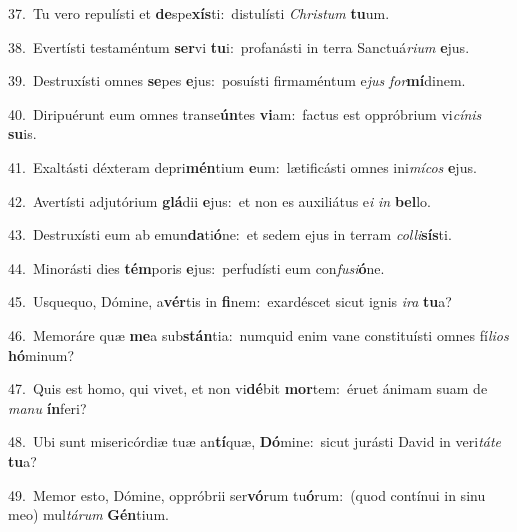 {\numbfont\textcolor{\numbcolor}{37.}}~Tu vero repulísti et \textbf{de}\-spe\-\textbf{xís}\-ti:~\star distulísti \textit{Chris}\-\textit{tum} \textbf{tu}\-um.\par
{\numbfont\textcolor{\numbcolor}{38.}}~Evertísti testaméntum \textbf{ser}\-vi \textbf{tu}\-i:~\star profanásti in terra Sanctuá\-\textit{ri}\-\textit{um} \textbf{e}\-jus.\par
{\numbfont\textcolor{\numbcolor}{39.}}~Destruxísti omnes \textbf{se}\-pes \textbf{e}\-jus:~\star posuísti firmaméntum e\textit{jus} \textit{for}\-\textbf{mí}dinem.\par
{\numbfont\textcolor{\numbcolor}{40.}}~Diripuérunt eum omnes transe\-\textbf{ún}\-tes \textbf{vi}\-am:~\star factus est oppróbrium vi\-\textit{cí}\-\textit{nis} \textbf{su}\-is.\par
{\numbfont\textcolor{\numbcolor}{41.}}~Exaltásti déxteram depri\-\textbf{mén}\-tium \textbf{e}\-um:~\star lætificásti omnes ini\-\textit{mí}\-\textit{cos} \textbf{e}\-jus.\par
{\numbfont\textcolor{\numbcolor}{42.}}~Avertísti adjutórium \textbf{glá}\-dii \textbf{e}\-jus:~\star et non es auxiliátus e\textit{i} \textit{in} \textbf{bel}\-lo.\par
{\numbfont\textcolor{\numbcolor}{43.}}~Destruxísti eum ab emun\-\textbf{da}\-ti\-\textbf{ó}\-ne:~\star et sedem ejus in terram \textit{col}\-\textit{li}\textbf{sís}ti.\par
{\numbfont\textcolor{\numbcolor}{44.}}~Minorásti dies \textbf{tém}\-poris \textbf{e}\-jus:~\star perfudísti eum con\-\textit{fu}\-\textit{si}\textbf{ó}ne.\par
{\numbfont\textcolor{\numbcolor}{45.}}~Usquequo, Dómine, a\-\textbf{vér}\-tis in \textbf{fi}\-nem:~\star exardéscet sicut ignis \textit{i}\-\textit{ra} \textbf{tu}\-a?\par
{\numbfont\textcolor{\numbcolor}{46.}}~Memoráre quæ \textbf{me}\-a sub\-\textbf{stán}\-tia:~\star numquid enim vane constituísti omnes fí\-\textit{li}\-\textit{os} \textbf{hó}\-minum?\par
{\numbfont\textcolor{\numbcolor}{47.}}~Quis est homo, qui vivet, et non vi\-\textbf{dé}\-bit \textbf{mor}\-tem:~\star éruet ánimam suam de \textit{ma}\-\textit{nu} \textbf{ín}\-feri?\par
{\numbfont\textcolor{\numbcolor}{48.}}~Ubi sunt misericórdiæ tuæ an\-\textbf{tí}\-quæ, \textbf{Dó}\-mine:~\star sicut jurásti David in veri\-\textit{tá}\-\textit{te} \textbf{tu}\-a?\par
{\numbfont\textcolor{\numbcolor}{49.}}~Memor esto, Dómine, oppróbrii ser\-\textbf{vó}\-rum tu\-\textbf{ó}\-rum:~\star (quod contínui in sinu meo) mul\-\textit{tá}\-\textit{rum} \textbf{Gén}\-tium.\par
